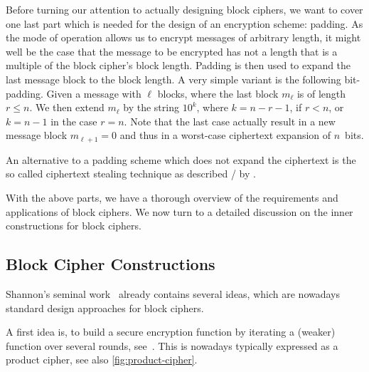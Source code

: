 Before turning our attention to actually designing block ciphers, we want to cover one last part which is needed for the design of an encryption scheme: padding.
As the mode of operation allows us to encrypt messages of arbitrary length, it might well be the case that the message to be encrypted has not a length that is a multiple of the block cipher's block length.
Padding is then used to expand the last message block to the block length.
A very simple variant is the following bit-padding.
Given a message with $\ell$ blocks, where the last block $m_\ell$ is of length $r \leqslant n$.
We then extend $m_\ell$ by the string $10^k$, where $k = n-r-1$, if $r < n$, or $k = n-1$ in the case $r=n$.
Note that the last case actually result in a new message block $m_{\ell+1} = 0$ and thus in a worst-case ciphertext expansion of $n$~bits.

An alternative to a padding scheme which does not expand the ciphertext is the so called ciphertext stealing technique as described \eg/ by \textcite[Section~2.4]{meyermatyas}.

With the above parts, we have a thorough overview of the requirements and applications of block ciphers.
We now turn to a detailed discussion on the inner constructions for block ciphers.

\subsection{Block Cipher Constructions}\label{sec:prelim:bcc}
Shannon's seminal work~\cite{shannon45,Shannon49} already contains several ideas, which are nowadays standard design approaches for block ciphers.

A first idea is, to build a secure encryption function by iterating a (weaker) function over several rounds, see~\cite[Sections~37 and~38]{shannon45}.
This is nowadays typically expressed as a product cipher, see also \cref{fig:product-cipher}.


